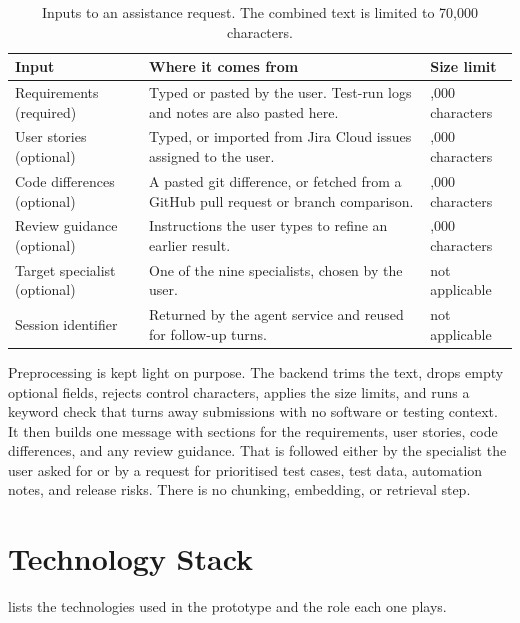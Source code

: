 \begin{table}[htbp]
\centering
\small
{}
\begin{tabularx}{\textwidth}{>{\raggedright\arraybackslash}p{}>{\raggedright\arraybackslash}X>{\raggedright\arraybackslash}p{}}
\toprule
\textbf{Input} & \textbf{Where it comes from} & \textbf{Size limit} \\
\midrule
Requirements (required) & Typed or pasted by the user. Test-run logs and notes are also pasted here. & 20,000 characters \\
User stories (optional) & Typed, or imported from Jira Cloud issues assigned to the user. & 20,000 characters \\
Code differences (optional) & A pasted git difference, or fetched from a GitHub pull request or branch comparison. & 50,000 characters \\
Review guidance (optional) & Instructions the user types to refine an earlier result. & 5,000 characters \\
Target specialist (optional) & One of the nine specialists, chosen by the user. & not applicable \\
Session identifier & Returned by the agent service and reused for follow-up turns. & not applicable \\
\bottomrule
\end{tabularx}
\caption{Inputs to an assistance request. The combined text is limited to 70,000 characters.}
\label{tab:inputs}
\end{table}

Preprocessing is kept light on purpose. The backend trims the text, drops empty optional fields, rejects control characters, applies the size limits, and runs a keyword check that turns away submissions with no software or testing context. It then builds one message with sections for the requirements, user stories, code differences, and any review guidance. That is followed either by the specialist the user asked for or by a request for prioritised test cases, test data, automation notes, and release risks. There is no chunking, embedding, or retrieval step.

\clearpage
\section{Technology Stack}
 lists the technologies used in the prototype and the role each one plays.

